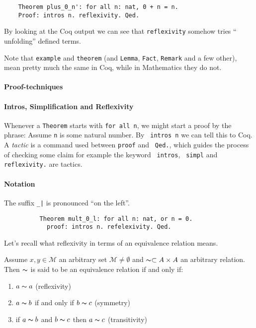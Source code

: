 	\begin{lstlisting}
    Theorem plus_0_n': for all n: nat, 0 + n = n.
    Proof: intros n. reflexivity. Qed.	
    \end{lstlisting}
    
    By looking at the Coq output we can see that \lstinline!reflexivity! somehow tries ``	unfolding'' defined terms.
    
    Note that \lstinline!example! and \lstinline!theorem! (and \lstinline!Lemma!, \lstinline!Fact!, \lstinline!Remark! and a few other),
    mean pretty much the same in Coq, while in Mathematics they do not.
    
   
     
    \paragraph{Proof-techniques}
    
    \paragraph{Intros, Simplification and Reflexivity}
     Whenever a \lstinline!Theorem! starts with \lstinline!for all n!, we might start a proof by the phrase:
     Assume \lstinline!n! is some natural number. By \lstinline! intros n! we can tell this to Coq.\\
     A {\itshape tactic} is a command used between \lstinline!proof! and \lstinline! Qed.!, 
     which guides the process of checking some claim for example the keyword \lstinline! intros!, \lstinline! simpl! and \lstinline!reflexivity.! 
     are tactics.
     \paragraph{Notation} 
     The suffix \lstinline!_|! is pronounced ``on the left''. 
     \begin{example}
	     \begin{lstlisting}
	      Theorem mult_0_l: for all n: nat, or n = 0.
	        proof: intros n. refelexivity. Qed.
	     \end{lstlisting}
     \end{example} 
  
   Let's recall what reflexivity in terms of an equivalence relation means.  
   \begin{definition}
   Assume $x,y\in \mathcal{M}$ an arbitrary set $\mathcal{M}\neq\emptyset$ and $\thicksim\subset A \times A $ an arbitrary relation.
   Then $\thicksim$ is said to be an equivalence relation if and only if:
   \begin{enumerate}
   \item $a\thicksim a$ (reflexivity)
   \item $a \thicksim b$ if and only if $b \thicksim c$ (symmetry)
   \item if $a \thicksim b$ and $ b\thicksim c$ then $a \thicksim c$ (transitivity) 
   \end{enumerate}
   \end{definition}
     
